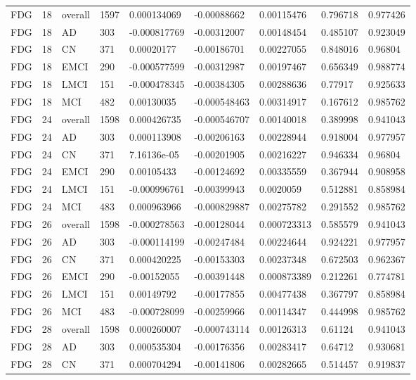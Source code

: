 \begin{landscape}
\begin{longtable}{lllllllll}
FDG & 18 & overall & 1597 & 0.000134069 & -0.00088662 & 0.00115476 & 0.796718 & 0.977426 \\
FDG & 18 & AD & 303 & -0.000817769 & -0.00312007 & 0.00148454 & 0.485107 & 0.923049 \\
FDG & 18 & CN & 371 & 0.00020177 & -0.00186701 & 0.00227055 & 0.848016 & 0.96804 \\
FDG & 18 & EMCI & 290 & -0.000577599 & -0.00312987 & 0.00197467 & 0.656349 & 0.988774 \\
FDG & 18 & LMCI & 151 & -0.000478345 & -0.00384305 & 0.00288636 & 0.77917 & 0.925633 \\
FDG & 18 & MCI & 482 & 0.00130035 & -0.000548463 & 0.00314917 & 0.167612 & 0.985762 \\
FDG & 24 & overall & 1598 & 0.000426735 & -0.000546707 & 0.00140018 & 0.389998 & 0.941043 \\
FDG & 24 & AD & 303 & 0.000113908 & -0.00206163 & 0.00228944 & 0.918004 & 0.977957 \\
FDG & 24 & CN & 371 & 7.16136e-05 & -0.00201905 & 0.00216227 & 0.946334 & 0.96804 \\
FDG & 24 & EMCI & 290 & 0.00105433 & -0.00124692 & 0.00335559 & 0.367944 & 0.908958 \\
FDG & 24 & LMCI & 151 & -0.000996761 & -0.00399943 & 0.0020059 & 0.512881 & 0.858984 \\
FDG & 24 & MCI & 483 & 0.000963966 & -0.000829887 & 0.00275782 & 0.291552 & 0.985762 \\
FDG & 26 & overall & 1598 & -0.000278563 & -0.00128044 & 0.000723313 & 0.585579 & 0.941043 \\
FDG & 26 & AD & 303 & -0.000114199 & -0.00247484 & 0.00224644 & 0.924221 & 0.977957 \\
FDG & 26 & CN & 371 & 0.000420225 & -0.00153303 & 0.00237348 & 0.672503 & 0.962367 \\
FDG & 26 & EMCI & 290 & -0.00152055 & -0.00391448 & 0.000873389 & 0.212261 & 0.774781 \\
FDG & 26 & LMCI & 151 & 0.00149792 & -0.00177855 & 0.00477438 & 0.367797 & 0.858984 \\
FDG & 26 & MCI & 483 & -0.000728099 & -0.00259966 & 0.00114347 & 0.444998 & 0.985762 \\
FDG & 28 & overall & 1598 & 0.000260007 & -0.000743114 & 0.00126313 & 0.61124 & 0.941043 \\
FDG & 28 & AD & 303 & 0.000535304 & -0.00176356 & 0.00283417 & 0.64712 & 0.930681 \\
FDG & 28 & CN & 371 & 0.000704294 & -0.00141806 & 0.00282665 & 0.514457 & 0.919837 \\

\end{longtable}
\end{landscape}
